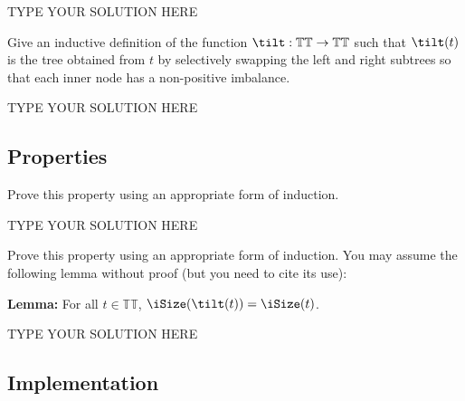 \documentclass[11pt]{article}
\newcommand{\declarecommand}[1]{\providecommand{#1}{}\renewcommand{#1}}
\begin{document}
\begin{solution}
TYPE YOUR SOLUTION HERE
\end{solution}


\begin{task}{2} %
Give an inductive definition of the function $\tilt: \mathbb{TT}
\rightarrow \mathbb{TT}$ such that $\tilt(t)$ is the tree obtained from
$t$ by selectively swapping the left and right subtrees so that each inner
node has a non-positive imbalance.
\end{task}

\begin{solution}
TYPE YOUR SOLUTION HERE
\end{solution}


\subsection{Properties}

\begin{task}{8} %
Prove this property using an appropriate form of induction.
\end{task}

\begin{solution}
TYPE YOUR SOLUTION HERE
\end{solution}


\begin{task}{10} %
Prove this property using an appropriate form of induction.  You may assume
the following lemma without proof (but you need to cite its use):

\medskip
\noindent
\textbf{Lemma:} For all $t\in\mathbb{TT}$, $\iSize(\tilt(t)) = \iSize(t)$.
\end{task}

\begin{solution}
TYPE YOUR SOLUTION HERE
\end{solution}


\subsection{Implementation}

\addtocounter{taskNum}{1}
\addtocounter{taskNum}{1}
\addtocounter{taskNum}{1}
\addtocounter{taskNum}{1}
\addtocounter{taskNum}{1}
\declarecommand{\Nil}{\mathit{nil}}
\declarecommand{\Cons}[2]{#1::#2}
\declarecommand{\TurnString}{right}
\declarecommand{\makeTurnString}{turnRight}
\declarecommand{\DOM}{\mathbb{N}}
\declarecommand{\Turn}{\mathit{\TurnString}}
\declarecommand{\Step}[1]{\mathit{step}\:#1}
\declarecommand{\N}{\mathit{north}}
\declarecommand{\E}{\mathit{east}}
\declarecommand{\W}{\mathit{west}}
\declarecommand{\makeTurn}{\mathit{\makeTurnString}}
\declarecommand{\Move}{\mathit{move}}
\declarecommand{\getPos}{\mathit{getPosition}}
\declarecommand{\reverse}{\mathit{reverse}}
\declarecommand{\goBack}{\mathit{goBack}}
\end{document}
